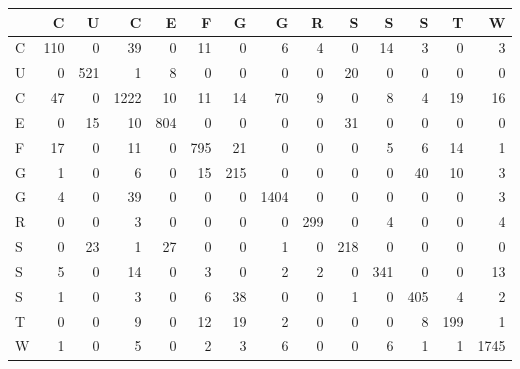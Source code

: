 \begin{tabular}{lrrrrrrrrrrrrr}
\toprule
{} &    C &    U &     C &    E &    F &    G &     G &    R &    S &    S &    S &    T &     W \\
\midrule
C &  110 &    0 &    39 &    0 &   11 &    0 &     6 &    4 &    0 &   14 &    3 &    0 &     3 \\
U &    0 &  521 &     1 &    8 &    0 &    0 &     0 &    0 &   20 &    0 &    0 &    0 &     0 \\
C &   47 &    0 &  1222 &   10 &   11 &   14 &    70 &    9 &    0 &    8 &    4 &   19 &    16 \\
E &    0 &   15 &    10 &  804 &    0 &    0 &     0 &    0 &   31 &    0 &    0 &    0 &     0 \\
F &   17 &    0 &    11 &    0 &  795 &   21 &     0 &    0 &    0 &    5 &    6 &   14 &     1 \\
G &    1 &    0 &     6 &    0 &   15 &  215 &     0 &    0 &    0 &    0 &   40 &   10 &     3 \\
G &    4 &    0 &    39 &    0 &    0 &    0 &  1404 &    0 &    0 &    0 &    0 &    0 &     3 \\
R &    0 &    0 &     3 &    0 &    0 &    0 &     0 &  299 &    0 &    4 &    0 &    0 &     4 \\
S &    0 &   23 &     1 &   27 &    0 &    0 &     1 &    0 &  218 &    0 &    0 &    0 &     0 \\
S &    5 &    0 &    14 &    0 &    3 &    0 &     2 &    2 &    0 &  341 &    0 &    0 &    13 \\
S &    1 &    0 &     3 &    0 &    6 &   38 &     0 &    0 &    1 &    0 &  405 &    4 &     2 \\
T &    0 &    0 &     9 &    0 &   12 &   19 &     2 &    0 &    0 &    0 &    8 &  199 &     1 \\
W &    1 &    0 &     5 &    0 &    2 &    3 &     6 &    0 &    0 &    6 &    1 &    1 &  1745 \\
\bottomrule
\end{tabular}
